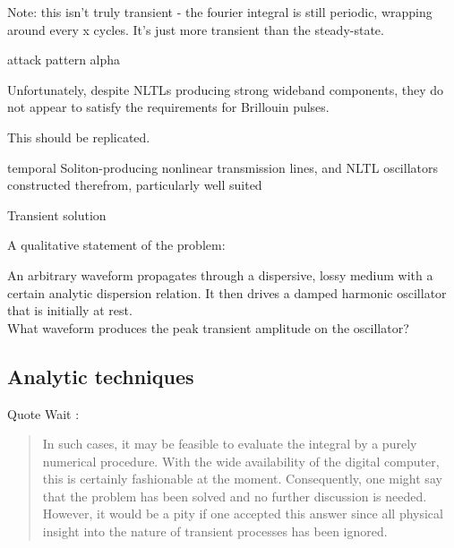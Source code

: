 \documentclass[paper.tex]{subfiles}
\begin{document}








Note: this isn't truly transient - the fourier integral is still periodic, wrapping around every x cycles. It's just more transient than the steady-state.




attack pattern alpha


 Unfortunately, despite NLTLs producing strong wideband components, they do not appear to satisfy the requirements for Brillouin pulses. 
\begin{autem}
	This should be replicated.
\end{autem}

temporal Soliton-producing nonlinear transmission lines, and NLTL oscillators constructed therefrom, particularly well suited 


Transient solution

\pagebreak
A qualitative statement of the problem:

\begin{toolchain}
An arbitrary waveform propagates through a dispersive, lossy medium with a certain analytic dispersion relation. It then drives a
damped harmonic oscillator that is initially at rest.\\

What waveform produces the peak transient amplitude on the oscillator?
\end{toolchain}

\subsection{Analytic techniques}

Quote Wait \cite{Propagation1965}:

\begin{quote}
	In such cases, it may be feasible to evaluate the integral by a purely numerical procedure. With the wide availability of the digital computer, this is certainly fashionable at the moment. Consequently, one might say that the problem has been solved and no further discussion is needed. \\
	
	However, it would be a pity if one accepted this answer since all physical insight into the nature of transient processes has been ignored. 
\end{quote}
\end{document}
